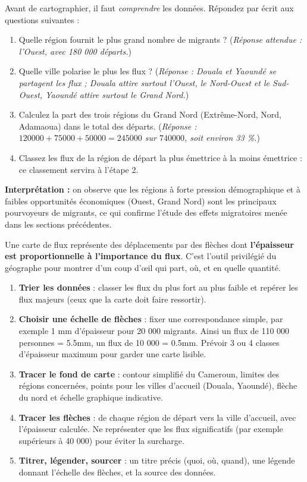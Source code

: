 \documentclass[11pt]{article}
\newcommand{\cle}[1]{{\popxbold\color{popdark}#1}}
\newcounter{popsec}
\newcounter{popsub}
\newcommand{\courssub}[1]{%
  \stepcounter{popsub}%
  \par\vspace{9pt}\noindent{\popxbold\fontsize{11.5}{13}\selectfont\color{popink}{\color{poporange}\thepopsec.\thepopsub}\hspace{6pt}#1}\par\nopagebreak\vspace{4pt}
}
\begin{document}
\begin{experience}
Avant de cartographier, il faut \emph{comprendre} les données. Répondez par écrit aux questions suivantes :
\begin{enumerate}
\item Quelle région fournit le plus grand nombre de migrants ? (\emph{Réponse attendue : l'Ouest, avec 180 000 départs.})
\item Quelle ville polarise le plus les flux ? (\emph{Réponse : Douala et Yaoundé se partagent les flux ; Douala attire surtout l'Ouest, le Nord-Ouest et le Sud-Ouest, Yaoundé attire surtout le Grand Nord.})
\item Calculez la part des trois régions du Grand Nord (Extrême-Nord, Nord, Adamaoua) dans le total des départs. (\emph{Réponse : $120 000 + 75 000 + 50 000 = 245 000$ sur $740 000$, soit environ 33 \%.})
\item Classez les flux de la région de départ la plus émettrice à la moins émettrice : ce classement servira à l'étape 2.
\end{enumerate}
\textbf{Interprétation :} on observe que les régions à forte pression démographique et à faibles opportunités économiques (Ouest, Grand Nord) sont les principaux pourvoyeurs de migrants, ce qui confirme l'étude des effets migratoires menée dans les sections précédentes.
\end{experience}

\courssub{Étape 2 : construction de la carte de flux}

Une \cle{carte de flux} représente des déplacements par des flèches dont \textbf{l'épaisseur est proportionnelle à l'importance du flux}. C'est l'outil privilégié du géographe pour montrer d'un coup d'œil qui part, où, et en quelle quantité.

\begin{methode}
\begin{enumerate}
\item \textbf{Trier les données} : classer les flux du plus fort au plus faible et repérer les flux majeurs (ceux que la carte doit faire ressortir).
\item \textbf{Choisir une échelle de flèches} : fixer une correspondance simple, par exemple 1 mm d'épaisseur pour 20 000 migrants. Ainsi un flux de 110 000 personnes = 5.5mm, un flux de 10 000 = 0.5mm. Prévoir 3 ou 4 classes d'épaisseur maximum pour garder une carte lisible.
\item \textbf{Tracer le fond de carte} : contour simplifié du Cameroun, limites des régions concernées, points pour les villes d'accueil (Douala, Yaoundé), flèche du nord et échelle graphique indicative.
\item \textbf{Tracer les flèches} : de chaque région de départ vers la ville d'accueil, avec l'épaisseur calculée. Ne représenter que les flux significatifs (par exemple supérieurs à 40 000) pour éviter la surcharge.
\item \textbf{Titrer, légender, sourcer} : un titre précis (quoi, où, quand), une légende donnant l'échelle des flèches, et la source des données.
\end{enumerate}
\end{methode}
\end{document}
